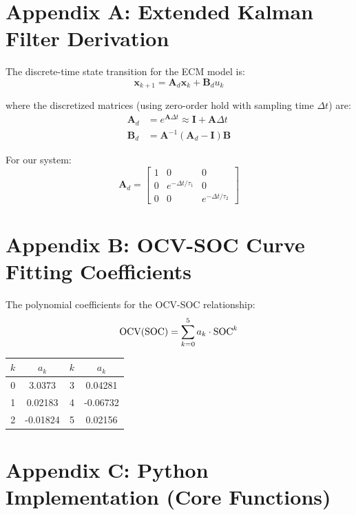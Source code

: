 \section*{Appendix A: Extended Kalman Filter Derivation}

The discrete-time state transition for the ECM model is:
\begin{equation}
\mathbf{x}_{k+1} = \mathbf{A}_d \mathbf{x}_k + \mathbf{B}_d u_k
\end{equation}

where the discretized matrices (using zero-order hold with sampling time $\Delta t$) are:
\begin{align}
\mathbf{A}_d &= e^{\mathbf{A}\Delta t} \approx \mathbf{I} + \mathbf{A}\Delta t \\
\mathbf{B}_d &= \mathbf{A}^{-1}(\mathbf{A}_d - \mathbf{I})\mathbf{B}
\end{align}

For our system:
\begin{equation}
\mathbf{A}_d = \begin{bmatrix}
1 & 0 & 0 \\
0 & e^{-\Delta t/\tau_1} & 0 \\
0 & 0 & e^{-\Delta t/\tau_2}
\end{bmatrix}
\end{equation}

\section*{Appendix B: OCV-SOC Curve Fitting Coefficients}

The polynomial coefficients for the OCV-SOC relationship:
\begin{equation}
\text{OCV}(\text{SOC}) = \sum_{k=0}^{5} a_k \cdot \text{SOC}^k
\end{equation}

\begin{table}[H]
\centering
\begin{tabular}{cc|cc}
\toprule
$k$ & $a_k$ & $k$ & $a_k$ \\
\midrule
0 & 3.0373 & 3 & 0.04281 \\
1 & 0.02183 & 4 & -0.06732 \\
2 & -0.01824 & 5 & 0.02156 \\
\bottomrule
\end{tabular}
\end{table}

\section*{Appendix C: Python Implementation (Core Functions)}

